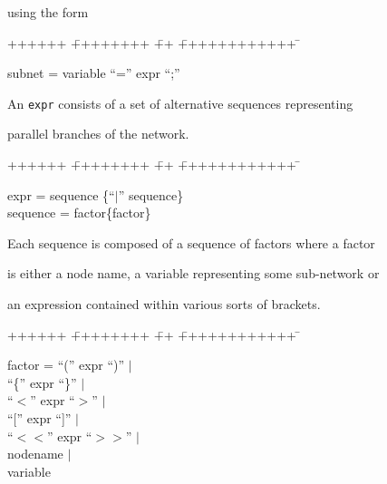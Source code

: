 using the form


{\sf


\begin{tabbing}


++++++ \= ++++++++ \= ++ \= ++++++++++++ \=  \kill


\>      subnet \> = \> variable ``='' expr ``;''


\end{tabbing}}


\noindent


An \texttt{expr} consists of a set of alternative sequences representing


parallel branches of the network. 


{\sf


\begin{tabbing}


++++++ \= ++++++++ \= ++ \= ++++++++++++ \=  \kill


\>      expr \>  = \> sequence \{``$|$'' sequence\} \\


\>      sequence \> = \> factor\{factor\}


\end{tabbing}}


\noindent


Each sequence is composed of a sequence of factors where a factor


is either a node name, a variable representing some sub-network or


an expression contained within various sorts of brackets.





{\sf


\begin{tabbing}


++++++ \= ++++++++ \= ++ \= ++++++++++++ \=  \kill


\>   factor \> = \> ``('' expr ``)'' \> $|$ \\


\>\>\>            ``\{'' expr ``\}'' \> $|$ \\


\>\>\>            ``$<$'' expr ``$>$'' \> $|$ \\


\>\>\>         ``['' expr ``]'' \>  $|$ \\


\>\>\>             ``$<<$'' expr ``$>>$'' \> $|$ \\


\>\>\>               nodename \> $|$ \\


\>\>\>               variable 


\end{tabbing}}





